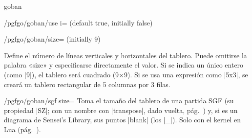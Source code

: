 \begin{environment}{{goban}}
\begin{key}{/pgfgo/goban/use i= (default true, initially false)}
\begin{codeexample}[]
			\begin{goban}[use i, label = {at = west}, partial = H1:M3]
			\end{goban}
			
			\begin{goban}[partial = H1:N3]
			\end{goban}
			
			\begin{goban}[label = {at = east}, partial = H1:N3]
			\end{goban}
		\end{codeexample}
	\end{key}
	
	\begin{key}{/pgfgo/goban/size= (initially 9)}
		
		Define el número de líneas verticales y horizontales del tablero. Puede omitirse la palabra «size» y especificarse directamente el valor. Si se indica un único entero (como |9|), el tablero será cuadrado (9×9). Si se usa una expresión como |5x3|, se creará un tablero rectangular de 5 columnas por 3 filas.
		
		\begin{codeexample}[width=6.5cm]
			\begin{goban}[5]
			\end{goban}
			
			\begin{goban}[5x3]
			\end{goban}
		\end{codeexample}
	\end{key}
	
	\begin{key}{/pgfgo/goban/sgf size=}
		Toma el tamaño del tablero de una partida SGF (su propiedad |SZ|; con un nombre con |transpose|, dado vuelta, pág.~\pageref{subsec:sgfnombres}) y, si es un diagrama de Sensei's Library, sus puntos |blank| (los |_|). Solo con el kernel en Lua (pág.~\pageref{subsec:kernel}).

		\begin{codeexample}[]
			\begin{goban}[sgf size = variantes, label = {at = {north, west}}]
			\end{goban}
		\end{codeexample}
	\end{key}


\end{environment}
